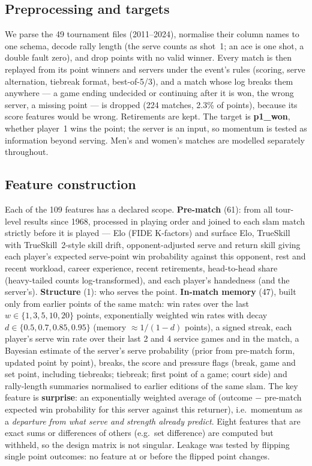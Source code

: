 \documentclass[10pt,a4paper]{article}
\begin{document}
\subsection{Preprocessing and targets}
We parse the 49 tournament files (2011--2024), normalise their column names to
one schema, decode rally length (the serve counts as shot~1; an ace is one shot,
a double fault zero), and drop points with no valid winner. Every match is then
replayed from its point winners and servers under the event's rules (scoring,
serve alternation, tiebreak format, best-of-5/3), and a match whose log breaks
them anywhere --- a game ending undecided or continuing after it is won, the
wrong server, a missing point --- is dropped (224 matches, 2.3\% of points),
because its score features would be wrong. Retirements are kept. The target is
\textbf{p1\_won}, whether player~1 wins the point; the server is an input, so
momentum is tested as information beyond serving. Men's and women's matches are
modelled separately throughout.

\subsection{Feature construction}
Each of the 109 features has a declared scope. \textbf{Pre-match} (61): from all
tour-level results since 1968, processed in playing order and joined to each
slam match strictly before it is played --- Elo (FIDE K-factors) and surface
Elo, TrueSkill with TrueSkill~2-style skill drift, opponent-adjusted serve and
return skill giving each player's expected serve-point win probability against
this opponent, rest and recent workload, career experience, recent retirements,
head-to-head share (heavy-tailed counts log-transformed), and each player's
handedness (and the server's).
\textbf{Structure} (1): who serves the point. \textbf{In-match memory} (47),
built only from earlier points of the same match: win rates over the last
$w\in\{1,3,5,10,20\}$ points, exponentially weighted win rates with decay
$d\in\{0.5,0.7,0.85,0.95\}$ (memory $\approx1/(1-d)$ points), a signed streak,
each player's serve win rate over their last 2 and 4 service games and in the
match, a Bayesian estimate of the server's serve probability (prior from
pre-match form, updated point by point), breaks, the score and pressure flags
(break, game and set point, including tiebreaks; tiebreak; first point of a
game; court side) and rally-length summaries normalised to earlier editions of
the same slam. The key feature is \textbf{surprise}: an exponentially weighted
average of (outcome $-$ pre-match expected win probability for this server
against this returner), i.e.\ momentum as a \emph{departure from what serve and
strength already predict}. Eight features that are exact sums or differences of
others (e.g.\ set difference) are computed but withheld, so the design matrix is
not singular. Leakage was tested by flipping single point outcomes: no feature at
or before the flipped point changes.
\end{document}
